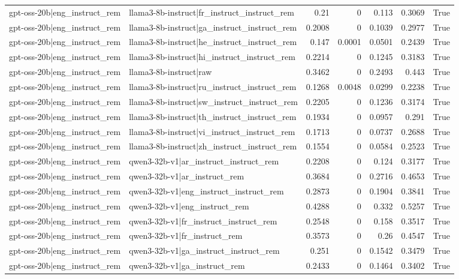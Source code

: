 \begin{table}
\begin{tabular}{l l r r r r l}
gpt-oss-20b|eng_instruct_rem & llama3-8b-instruct|fr_instruct_instruct_rem & 0.21 & 0 & 0.113 & 0.3069 & True \\
gpt-oss-20b|eng_instruct_rem & llama3-8b-instruct|ga_instruct_instruct_rem & 0.2008 & 0 & 0.1039 & 0.2977 & True \\
gpt-oss-20b|eng_instruct_rem & llama3-8b-instruct|he_instruct_instruct_rem & 0.147 & 0.0001 & 0.0501 & 0.2439 & True \\
gpt-oss-20b|eng_instruct_rem & llama3-8b-instruct|hi_instruct_instruct_rem & 0.2214 & 0 & 0.1245 & 0.3183 & True \\
gpt-oss-20b|eng_instruct_rem & llama3-8b-instruct|raw & 0.3462 & 0 & 0.2493 & 0.443 & True \\
gpt-oss-20b|eng_instruct_rem & llama3-8b-instruct|ru_instruct_instruct_rem & 0.1268 & 0.0048 & 0.0299 & 0.2238 & True \\
gpt-oss-20b|eng_instruct_rem & llama3-8b-instruct|sw_instruct_instruct_rem & 0.2205 & 0 & 0.1236 & 0.3174 & True \\
gpt-oss-20b|eng_instruct_rem & llama3-8b-instruct|th_instruct_instruct_rem & 0.1934 & 0 & 0.0957 & 0.291 & True \\
gpt-oss-20b|eng_instruct_rem & llama3-8b-instruct|vi_instruct_instruct_rem & 0.1713 & 0 & 0.0737 & 0.2688 & True \\
gpt-oss-20b|eng_instruct_rem & llama3-8b-instruct|zh_instruct_instruct_rem & 0.1554 & 0 & 0.0584 & 0.2523 & True \\
gpt-oss-20b|eng_instruct_rem & qwen3-32b-v1|ar_instruct_instruct_rem & 0.2208 & 0 & 0.124 & 0.3177 & True \\
gpt-oss-20b|eng_instruct_rem & qwen3-32b-v1|ar_instruct_rem & 0.3684 & 0 & 0.2716 & 0.4653 & True \\
gpt-oss-20b|eng_instruct_rem & qwen3-32b-v1|eng_instruct_instruct_rem & 0.2873 & 0 & 0.1904 & 0.3841 & True \\
gpt-oss-20b|eng_instruct_rem & qwen3-32b-v1|eng_instruct_rem & 0.4288 & 0 & 0.332 & 0.5257 & True \\
gpt-oss-20b|eng_instruct_rem & qwen3-32b-v1|fr_instruct_instruct_rem & 0.2548 & 0 & 0.158 & 0.3517 & True \\
gpt-oss-20b|eng_instruct_rem & qwen3-32b-v1|fr_instruct_rem & 0.3573 & 0 & 0.26 & 0.4547 & True \\
gpt-oss-20b|eng_instruct_rem & qwen3-32b-v1|ga_instruct_instruct_rem & 0.251 & 0 & 0.1542 & 0.3479 & True \\
gpt-oss-20b|eng_instruct_rem & qwen3-32b-v1|ga_instruct_rem & 0.2433 & 0 & 0.1464 & 0.3402 & True \\

\end{tabular}
\end{table}
